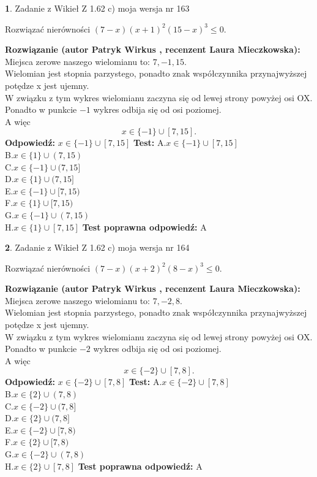 \documentclass[12pt, a4paper]{article}
\theoremstyle{definition} %
\newtheorem{zad}{}
\newcommand{\zadStart}[1]{\begin{zad}#1\newline}
\newcommand{\zadStop}{\end{zad}}
\newcommand{\rozwStart}[2]{\noindent \textbf{Rozwiązanie (autor #1 , recenzent #2): }\newline}
\newcommand{\rozwStop}{\newline}
\newcommand{\odpStart}{\noindent \textbf{Odpowiedź:}\newline}
\newcommand{\odpStop}{\newline}
\newcommand{\testStart}{\noindent \textbf{Test:}\newline}
\newcommand{\testStop}{\newline}
\newcommand{\kluczStart}{\noindent \textbf{Test poprawna odpowiedź:}\newline}
\newcommand{\kluczStop}{\newline}
\begin{document}
\zadStart{Zadanie z Wikieł Z 1.62 c) moja wersja nr 163}

Rozwiązać nierówności $(7-x)(x+1)^{2}(15-x)^{3}\le0$.
\zadStop
\rozwStart{Patryk Wirkus}{Laura Mieczkowska}
Miejsca zerowe naszego wielomianu to: $7, -1, 15$.\\
Wielomian jest stopnia parzystego, ponadto znak współczynnika przy\linebreak najwyższej potędze x jest ujemny.\\ W związku z tym wykres wielomianu zaczyna się od lewej strony powyżej osi OX.\\
Ponadto w punkcie $-1$ wykres odbija się od osi poziomej.\\
A więc $$x \in \{-1\} \cup [7,15].$$
\rozwStop
\odpStart
$x \in \{-1\} \cup [7,15]$
\odpStop
\testStart
A.$x \in \{-1\} \cup [7,15]$\\
B.$x \in \{1\} \cup (7,15)$\\
C.$x \in \{-1\} \cup (7,15]$\\
D.$x \in \{1\} \cup (7,15]$\\
E.$x \in \{-1\} \cup [7,15)$\\
F.$x \in \{1\} \cup [7,15)$\\
G.$x \in \{-1\} \cup (7,15)$\\
H.$x \in \{1\} \cup [7,15]$
\testStop
\kluczStart
A
\kluczStop



\zadStart{Zadanie z Wikieł Z 1.62 c) moja wersja nr 164}

Rozwiązać nierówności $(7-x)(x+2)^{2}(8-x)^{3}\le0$.
\zadStop
\rozwStart{Patryk Wirkus}{Laura Mieczkowska}
Miejsca zerowe naszego wielomianu to: $7, -2, 8$.\\
Wielomian jest stopnia parzystego, ponadto znak współczynnika przy\linebreak najwyższej potędze x jest ujemny.\\ W związku z tym wykres wielomianu zaczyna się od lewej strony powyżej osi OX.\\
Ponadto w punkcie $-2$ wykres odbija się od osi poziomej.\\
A więc $$x \in \{-2\} \cup [7,8].$$
\rozwStop
\odpStart
$x \in \{-2\} \cup [7,8]$
\odpStop
\testStart
A.$x \in \{-2\} \cup [7,8]$\\
B.$x \in \{2\} \cup (7,8)$\\
C.$x \in \{-2\} \cup (7,8]$\\
D.$x \in \{2\} \cup (7,8]$\\
E.$x \in \{-2\} \cup [7,8)$\\
F.$x \in \{2\} \cup [7,8)$\\
G.$x \in \{-2\} \cup (7,8)$\\
H.$x \in \{2\} \cup [7,8]$
\testStop
\kluczStart
A
\kluczStop
\end{document}

